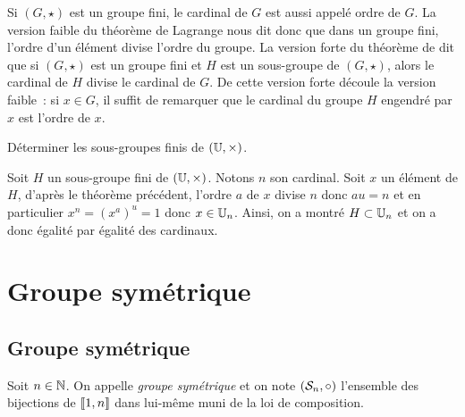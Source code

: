 \documentclass{magnolia}
\begin{document}
\begin{remarques}
\remarque Si $(G,\star)$ est un groupe fini, le cardinal de $G$ est aussi appelé
  ordre de $G$. La version faible du théorème de Lagrange nous dit donc que
  dans un groupe fini, l'ordre d'un élément divise l'ordre du groupe.
\remarque La version forte du théorème de  dit que si $(G,\star)$ est
  un groupe fini et $H$ est un sous-groupe de $(G,\star)$, alors le
  cardinal de $H$ divise le cardinal de $G$. De cette version forte découle
  la version faible~: si $x\in G$, il suffit de remarquer que le cardinal du
  groupe $H$ engendré par $x$ est l'ordre de $x$.
\end{remarques}

\begin{exoUnique}
\exo Déterminer les sous-groupes finis de $(\U,\times)$. 
\begin{sol}
Soit $H$ un sous-groupe fini de $(\U,\times)$.  Notons $n$ son cardinal. Soit $x$ un élément de $H$, d'après le théorème précédent, l'ordre $a$ de $x$ divise $n$ donc $au=n$ et en particulier $x^n=(x^a)^u=1$ donc $x\in \U[n]$. Ainsi, on a montré $H\subset \U[n]$ et on a donc égalité par égalité des cardinaux.
\end{sol}
\end{exoUnique}



\section{Groupe symétrique}
\subsection{Groupe symétrique}

\begin{definition}
Soit $n\in\mathbb{N}$. On appelle \emph{groupe symétrique} et on note $\left(\mathcal{S}_{n},\circ\right)$
l'ensemble des bijections de $\left\llbracket 1,n\right\rrbracket$ dans lui-même muni de la loi de
composition.
\end{definition}
\end{document}
